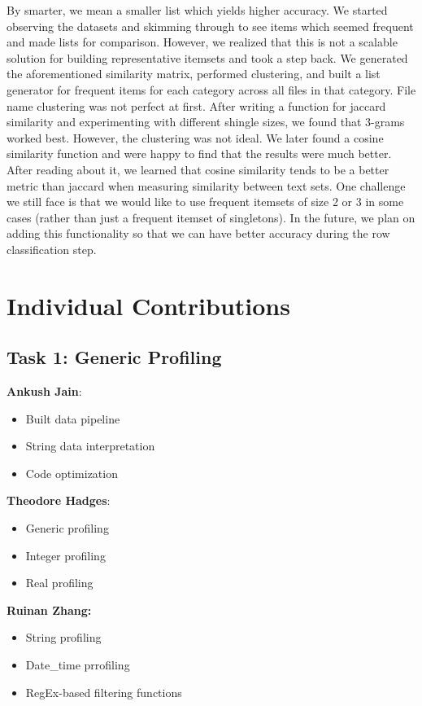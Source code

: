 \documentclass[sigconf,authordraft]{acmart}
\begin{document}
By smarter, we mean a smaller list which yields higher accuracy. We started observing the datasets and skimming through to see items which seemed frequent and made lists for comparison. However, we realized that this is not a scalable solution for building representative itemsets and took a step back. We generated the aforementioned similarity matrix, performed clustering, and built a list generator for frequent items for each category across all files in that category. File name clustering was not perfect at first. After writing a function for jaccard similarity and experimenting with different shingle sizes, we found that 3-grams worked best. However, the clustering was not ideal. We later found a cosine similarity function and were happy to find that the results were much better. After reading about it, we learned that cosine similarity tends to be a better metric than jaccard when measuring similarity between text sets. One challenge we still face is that we would like to use frequent itemsets of size 2 or 3 in some cases (rather than just a frequent itemset of singletons). In the future, we plan on adding this functionality so that we can have better accuracy during the row classification step.

\section{Individual Contributions}
\subsection{Task 1: Generic Profiling}
\textbf{Ankush Jain}: 
\begin{itemize}
    \item Built data pipeline
    \item String data interpretation
    \item Code optimization
\end{itemize}
\textbf{Theodore Hadges}: 
\begin{itemize}
    \item Generic profiling
    \item Integer profiling
    \item Real profiling
\end{itemize}
\textbf{Ruinan Zhang:}
\begin{itemize}
    \item String profiling
    \item Date\_time prrofiling
    \item RegEx-based filtering functions\newline
\end{itemize} 
\end{document}
